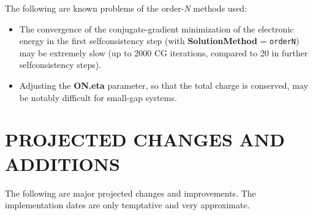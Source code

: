 The following are known problems of the order-{\it N} methods used:

\begin{itemize}

\item
The convergence of the conjugate-gradient minimization of the
electronic energy in the first selfconsistency step (with
{\bf SolutionMethod} = {\tt orderN}) may be extremely slow 
(up to 2000 CG iterations, compared to 20 in further 
selfconsistency steps).

\item
Adjusting the {\bf ON.eta} parameter, so that the total charge
is conserved, may be notably difficult for small-gap systems.

\end{itemize}



%
%




\section{PROJECTED CHANGES AND ADDITIONS}

The following are major projected changes and improvements.
The implementation dates are only temptative and very approximate.

